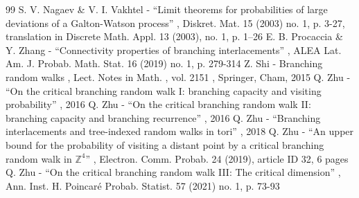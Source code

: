 \begin{thebibliography}{99}
 S. V. Nagaev \& V. I. Vakhtel - “Limit theorems for probabilities of large deviations of a Galton-Watson process” , Diskret. Mat. 15 (2003) no. 1, p. 3-27, translation in Discrete Math. Appl. 13 (2003), no. 1, p. 1–26
 E. B. Procaccia \& Y. Zhang - “Connectivity properties of branching interlacements” , ALEA Lat. Am. J. Probab. Math. Stat. 16 (2019) no. 1, p. 279-314
 Z. Shi - Branching random walks , Lect. Notes in Math. , vol. 2151 , Springer, Cham, 2015
 Q. Zhu - “On the critical branching random walk I: branching capacity and visiting probability” , 2016
 Q. Zhu - “On the critical branching random walk II: branching capacity and branching recurrence” , 2016
 Q. Zhu - “Branching interlacements and tree-indexed random walks in tori” , 2018
 Q. Zhu - “An upper bound for the probability of visiting a distant point by a critical branching random walk in $\mathbb{Z}^4$” , Electron. Comm. Probab. 24 (2019), article ID 32, 6 pages
 Q. Zhu - “On the critical branching random walk III: The critical dimension” , Ann. Inst. H. Poincaré Probab. Statist. 57 (2021) no. 1, p. 73-93
\end{thebibliography}
